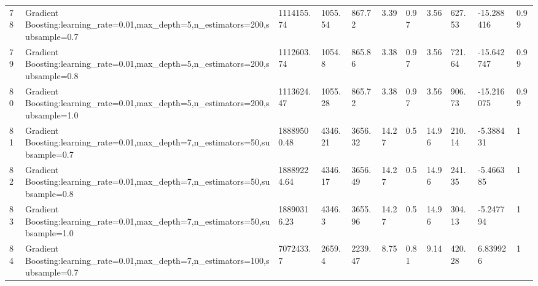\begin{longtable}{C{0.8cm} L{2cm} C{1.15cm} C{1.15cm} C{1.15cm} C{1.15cm} C{0.85cm} C{1.25cm} C{1.2cm} C{1.5cm} C{1.0cm}}
78 & Gradient Boosting:\newline learning\_rate=0.01,\newline max\_depth=5,\newline n\_estimators=200,\newline subsample=0.7 & 1114155.74 & 1055.54 & 867.72 & 3.39 & 0.97 & 3.56 & 627.53 & -15.288416 & 0.99 \\
79 & Gradient Boosting:\newline learning\_rate=0.01,\newline max\_depth=5,\newline n\_estimators=200,\newline subsample=0.8 & 1112603.74 & 1054.8 & 865.86 & 3.38 & 0.97 & 3.56 & 721.64 & -15.642747 & 0.99 \\
80 & Gradient Boosting:\newline learning\_rate=0.01,\newline max\_depth=5,\newline n\_estimators=200,\newline subsample=1.0 & 1113624.47 & 1055.28 & 865.72 & 3.38 & 0.97 & 3.56 & 906.73 & -15.216075 & 0.99 \\
81 & Gradient Boosting:\newline learning\_rate=0.01,\newline max\_depth=7,\newline n\_estimators=50,\newline subsample=0.7 & 18889500.48 & 4346.21 & 3656.32 & 14.27 & 0.5 & 14.96 & 210.14 & -5.388431 & 1 \\
82 & Gradient Boosting:\newline learning\_rate=0.01,\newline max\_depth=7,\newline n\_estimators=50,\newline subsample=0.8 & 18889224.64 & 4346.17 & 3656.49 & 14.27 & 0.5 & 14.96 & 241.35 & -5.466385 & 1 \\
83 & Gradient Boosting:\newline learning\_rate=0.01,\newline max\_depth=7,\newline n\_estimators=50,\newline subsample=1.0 & 18890316.23 & 4346.3 & 3655.96 & 14.27 & 0.5 & 14.96 & 304.13 & -5.247794 & 1 \\
84 & Gradient Boosting:\newline learning\_rate=0.01,\newline max\_depth=7,\newline n\_estimators=100,\newline subsample=0.7 & 7072433.7 & 2659.4 & 2239.47 & 8.75 & 0.81 & 9.14 & 420.28 & 6.839926 & 1 \\

\end{longtable}
